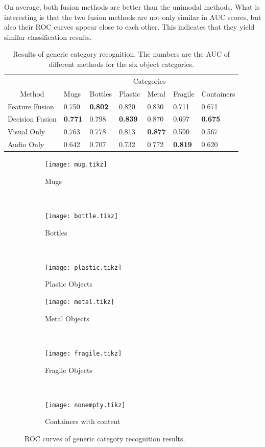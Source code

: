\documentclass[letterpaper, 10 pt, conference]{ieeeconf}
\begin{document}
On average, both fusion methods are better than the unimodal methods. What is interesting is that the two fusion methods are not only similar in AUC scores, but also their ROC curves appear close to each other. This indicates that they yield similar classification results.

\begin{table}
  \caption[Results of generic category recognition.]{Results of generic category recognition. The numbers are the AUC of different methods for the six object categories.}
  \label{tab:cateory}
  \centering
  \begin{tabular}[h]{l*{5}{p{.07\linewidth}}p{.11\linewidth}}
    \toprule
    & \multicolumn{6}{c}{Categories} \tabularnewline \cmidrule(r){2-7}
    \multicolumn{1}{c}{Method} & Mugs & Bottles & Plastic & Metal & Fragile & Containers \tabularnewline \midrule
    Feature Fusion & 0.750 & \textbf{0.802} & 0.820 & 0.830 & 0.711 & 0.671 \tabularnewline
    Decision Fusion & \textbf{0.771} & 0.798 & \textbf{0.839} & 0.870 & 0.697 & \textbf{0.675} \tabularnewline
    Visual Only & 0.763 & 0.778 & 0.813 & \textbf{0.877} & 0.590 & 0.567 \tabularnewline
    Audio Only & 0.642 & 0.707 & 0.732 & 0.772 & \textbf{0.819} & 0.620 \tabularnewline
    \bottomrule
  \end{tabular}
\end{table}

\begin{figure}[t]
  \footnotesize
  \centering
  \begin{subfigure}[b]{.3\linewidth}
    \texttt{[image: mug.tikz]}
    \caption{Mugs}
    \label{fig:rocmug}
  \end{subfigure}
  ~
  \begin{subfigure}[b]{.3\linewidth}
    \centering
    \texttt{[image: bottle.tikz]}
    \caption{Bottles}
    \label{fig:rocbottle}
  \end{subfigure}
  ~
  \begin{subfigure}[b]{.3\linewidth}
    \texttt{[image: plastic.tikz]}
    \caption{Plastic Objects}
    \label{fig:rocplastic}
  \end{subfigure}

  \begin{subfigure}[b]{.3\linewidth}
    \centering
    \texttt{[image: metal.tikz]}
    \caption{Metal Objects}
    \label{fig:rocmetal}
  \end{subfigure}
  ~
  \begin{subfigure}[b]{.3\linewidth}
    \texttt{[image: fragile.tikz]}
    \caption{Fragile Objects}
    \label{fig:rocfragile}
  \end{subfigure}
  ~
  \begin{subfigure}[b]{.3\linewidth}
    \centering
    \texttt{[image: nonempty.tikz]}
    \caption{Containers with content}
    \label{fig:rocnonempty}
  \end{subfigure}
  \caption{ROC curves of generic category recognition results.}
  \label{fig:catroc}
\end{figure}
\end{document}
